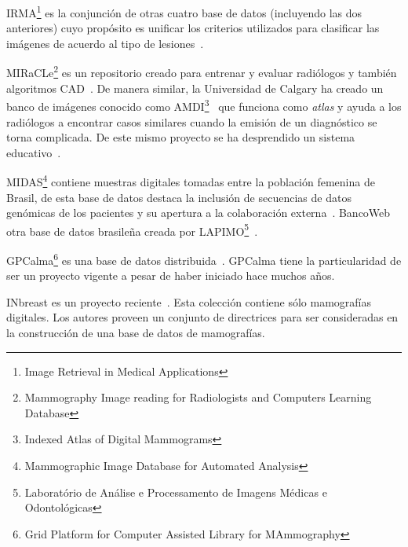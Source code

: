 IRMA\footnote{Image Retrieval in Medical Applications} es la conjunción de
otras cuatro base de datos (incluyendo las dos anteriores) cuyo propósito es
unificar los criterios utilizados para clasificar las imágenes de acuerdo al
tipo de lesiones~\cite{irma}.

MIRaCLe\footnote{Mammography Image reading for Radiologists and Computers
Learning Database} es un repositorio creado para entrenar y evaluar radiólogos
y también algoritmos CAD~\cite{antoniou2009web}. De manera similar, la
Universidad de Calgary ha creado un banco de imágenes conocido como
AMDI\footnote{Indexed Atlas of Digital Mammograms}~\cite{suri2006recent} que
funciona como \textit{atlas} y ayuda a los radiólogos a encontrar casos
similares cuando la emisión de un diagnóstico se torna complicada. De este
mismo proyecto se ha desprendido un sistema educativo~\cite{guliato2009indiam}.

MIDAS\footnote{Mammographic Image Database for Automated Analysis} contiene
muestras digitales tomadas entre la población femenina de Brasil, de esta base
de datos destaca la inclusión de secuencias de datos genómicas de los pacientes
y su apertura a la colaboración externa~\cite{fernandes2012midas}. BancoWeb
otra base de datos brasileña creada por LAPIMO\footnote{Laboratório de Análise
e Processamento de Imagens Médicas e Odontológicas}~\cite{matheus2011online}.

GPCalma\footnote{Grid Platform for Computer Assisted Library for MAmmography}
es una base de datos distribuida~\cite{lauria2006gpcalma}. GPCalma tiene la
particularidad de ser un proyecto vigente a pesar de haber iniciado hace muchos
años.

INbreast es un proyecto reciente~\cite{moreira2012inbreast}. Esta colección
contiene sólo mamografías digitales. Los autores proveen un conjunto de
directrices para ser consideradas en la construcción de una base de datos de
mamografías.


